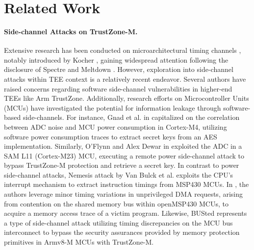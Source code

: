 \section{Related Work}\label{sec:related3}

\paragraph{Side-channel Attacks on TrustZone-M.}
 
 Extensive research has been conducted on microarchitectural timing channels \cite{timingattack}, notably introduced by Kocher \cite{Kocher96}, gaining widespread attention following the disclosure of Spectre \cite{spectre} and Meltdown \cite{meltdown}. However, exploration into side-channel attacks within TEE context is a relatively recent endeavor. Several authors \cite{loadstep, truspy, Bypassed, Qualcomm, vanbulckphdthesis, gross2019breaking, surveyonTEE} have raised concerns regarding software side-channel vulnerabilities in higher-end TEEs like Arm TrustZone. Additionally, research efforts on Microcontroller Units (MCUs) \cite{Nemesis, marton, busted, returntononsecure, oflynn2019ondevice, barenghi2021cortexm, gnad2019leakynoise} have investigated the potential for information leakage through software-based side-channels. For instance, Gnad et al. in \cite{gnad2019leakynoise} capitalized on the correlation between ADC noise and MCU power consumption in Cortex-M4, utilizing software power consumption traces to extract secret keys from an AES implementation. Similarly, O'Flynn and Alex Dewar in \cite{oflynn2019ondevice} exploited the ADC in a SAM L11 (Cortex-M23) MCU, executing a remote power side-channel attack to bypass TrustZone-M protection and retrieve a secret key. In contrast to power side-channel attacks, Nemesis attack by Van Bulck et al. \cite{Nemesis} exploits the CPU's interrupt mechanism to extract instruction timings from MSP430 MCUs. In \cite{marton}, the authors leverage minor timing variations in unprivileged DMA requests, arising from contention on the shared memory bus within openMSP430 MCUs, to acquire a memory access trace of a victim program. Likewise, BUSted \cite{busted} represents a type of side-channel attack utilizing timing discrepancies on the MCU bus interconnect to bypass the security assurances provided by memory protection primitives in Armv8-M MCUs with TrustZone-M.
 
